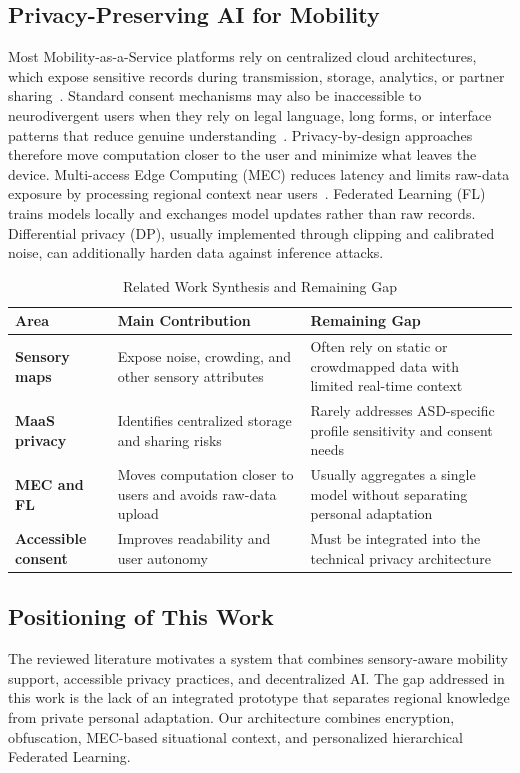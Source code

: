 \documentclass[lettersize,journal]{IEEEtran}
\begin{document}
\subsection{Privacy-Preserving AI for Mobility}
Most Mobility-as-a-Service platforms rely on centralized cloud
architectures, which expose sensitive records during transmission,
storage, analytics, or partner sharing~\cite{garroussi2025}. Standard
consent mechanisms may also be inaccessible to neurodivergent users
when they rely on legal language, long forms, or interface patterns that
reduce genuine understanding~\cite{beck2025}. Privacy-by-design
approaches therefore move computation closer to the user and minimize
what leaves the device. Multi-access Edge Computing (MEC) reduces
latency and limits raw-data exposure by processing regional context
near users~\cite{alwarafy2020}. Federated Learning (FL) trains models
locally and exchanges model updates rather than raw records. Differential
privacy (DP), usually implemented through clipping and calibrated noise,
can additionally harden data against inference attacks.

\begin{table}[!t]
\caption{Related Work Synthesis and Remaining Gap\label{tab:related_work_synthesis}}
\centering
\scriptsize
\renewcommand{\arraystretch}{1.2}
\begin{tabularx}{\columnwidth}{
>{\raggedright\bfseries}p{1.7cm}
>{\raggedright}X
>{\raggedright\arraybackslash}X}
\toprule
\rowcolor{gray!15}
\textbf{Area} & \textbf{Main Contribution} & \textbf{Remaining Gap} \\
\midrule
Sensory maps &
Expose noise, crowding, and other sensory attributes &
Often rely on static or crowdmapped data with limited real-time context \\
\midrule
MaaS privacy &
Identifies centralized storage and sharing risks &
Rarely addresses ASD-specific profile sensitivity and consent needs \\
\midrule
MEC and FL &
Moves computation closer to users and avoids raw-data upload &
Usually aggregates a single model without separating personal adaptation \\
\midrule
Accessible consent &
Improves readability and user autonomy &
Must be integrated into the technical privacy architecture \\
\bottomrule
\end{tabularx}
\end{table}

\subsection{Positioning of This Work}
The reviewed literature motivates a system that combines sensory-aware
mobility support, accessible privacy practices, and decentralized AI.
The gap addressed in this work is the lack of an integrated prototype
that separates regional knowledge from private personal adaptation. Our
architecture combines encryption, obfuscation, MEC-based situational
context, and personalized hierarchical Federated Learning.
\end{document}

